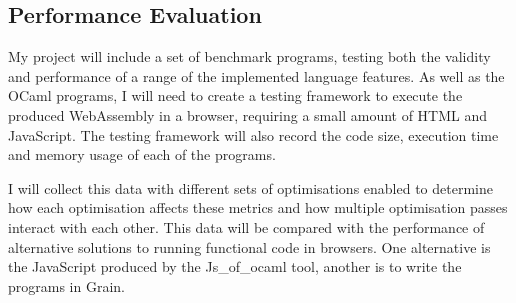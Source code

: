 \documentclass[12pt]{article}
\begin{document}

\subsection*{Performance Evaluation}
My project will include a set of benchmark programs, testing both the validity and performance of a range of the implemented language features. As well as the OCaml programs, I will need to create a testing framework to execute the produced WebAssembly in a browser, requiring a small amount of HTML and JavaScript. The testing framework will also record the code size, execution time and memory usage of each of the programs. 

I will collect this data with different sets of optimisations enabled to determine how each optimisation affects these metrics and how multiple optimisation passes interact with each other. This data will be compared with the performance of alternative solutions to running functional code in browsers. One alternative is the JavaScript produced by the Js\_of\_ocaml tool, another is to write the programs in Grain.
\end{document}
